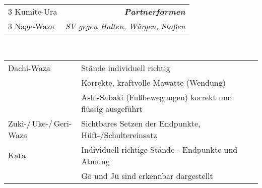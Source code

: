 \begin{tcolorbox}[colframe=BLBELT,colback=white,coltitle=white,title=5. Kyu:\indent Kihon-Ido Kata - Partnerformen - Erwartungshorizont]
\begin{minipage}[t]{0.45\textwidth}
\begin{tabularx}{\textwidth}{cX}
			\midrule
		\end{tabularx}
	\end{minipage}
	\null\hfill\null
	\begin{minipage}[t]{0.45\textwidth}
		\begin{tabularx}{\textwidth}{Xr}
			\midrule
			3 Kumite-Ura	&{\textbf{\textit{Partnerformen}}}\\
			3 Nage-Waza		&{\small \textit{SV gegen Halten, Würgen, Stoßen}} \\
			\midrule
		\end{tabularx}
	\end{minipage}\\
	\null\vfill\null
	{\small\begin{tabularx}{\textwidth}{ll}
		\midrule
		Dachi-Waza	&	Stände individuell richtig \\
		&	Korrekte, kraftvolle Mawatte (Wendung)\\
		&	Ashi-Sabaki (Fußbewegungen) korrekt und flüssig ausgeführt\\
		Zuki-/\,Uke-/\,Geri-Waza	&	Sichtbares Setzen der Endpunkte, Hüft-/Schultereinsatz\\
		Kata		&	Individuell richtige Stände - Endpunkte und Atmung\\
		&	G\={o} und J\={u} sind erkennbar dargestellt\\
		\midrule
	\end{tabularx}}\null\vfill\null
\end{tcolorbox}	